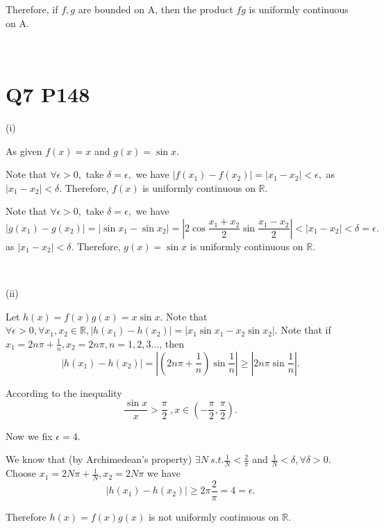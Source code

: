 \documentclass[12pt]{article}%
\begin{document}
Therefore,  if $f,g$ are bounded on A, then the product $fg$ is uniformly continuous on A.

~\

\section{Q7 P148}

(i)

As given $f(x)=x$ and $g(x)=\sin{x}.$ 

Note that $\forall \epsilon>0,$ take $\delta = \epsilon,$ we have $|f(x_1)-f(x_2)|=|x_1-x_2|<\epsilon,$ as $|x_1-x_2|<\delta.$ Therefore, $f(x)$ is uniformly continuous on $\mathbb{R}.$

Note that $\forall \epsilon>0,$ take $\delta =\epsilon ,$ we have $$|g(x_1)-g(x_2)|=|\sin{x_1}-\sin{x_2}|=|2\cos{\frac{x_1+x_2}{2}}\sin{\frac{x_1-x_2}{2}}|<|x_1-x_2|<\delta=\epsilon.$$ 
as $|x_1-x_2|<\delta.$ Therefore, $g(x)=\sin{x}$ is uniformly continuous on $\mathbb{R}.$


~\ 

(ii)

Let $h(x)=f(x)g(x)=x\sin{x}.$ Note that $\forall \epsilon>0, \forall x_1,x_2 \in \mathbb{R}, |h(x_1)-h(x_2)|=|x_1\sin{x_1} - x_2\sin{x_2}|.$ Note that if $x_1=2n\pi +\frac{1}{n}, x_2=2n\pi, n = 1,2,3...$, then $$|h(x_1)-h(x_2)|=|(2n\pi +\frac{1}{n})\sin{\frac{1}{n}}|\geq |2n\pi \sin{\frac{1}{n}}|.$$ 

According to the inequality $$\frac{\sin{x}}x{}>\frac{\pi}{2}~, x\in (-\frac{\pi}{2},\frac{\pi}{2}).$$ 

Now we fix $\epsilon = 4.$

We know that (by Archimedean's property) $\exists N~s.t. \frac{1}{N}<\frac{2}{\pi}$ and $\frac{1}{N}<\delta, \forall \delta>0.$ Choose $x_1 = 2N\pi +\frac{1}{N}, x_2 = 2N\pi$ we have $$|h(x_1)-h(x_2)|\geq 2\pi \frac{2}{\pi}=4=\epsilon.$$

Therefore $h(x)=f(x)g(x)$ is not uniformly continuous on $\mathbb{R}.$
\end{document}
